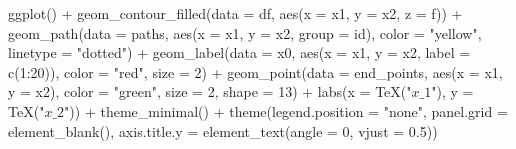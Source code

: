 \documentclass[
  a4paperpaper,
]{article}
\newenvironment{Shaded}{\begin{snugshade}}{\end{snugshade}}
\newcommand{\AttributeTok}[1]{\textcolor[rgb]{0.40,0.45,0.13}{#1}}
\newcommand{\DecValTok}[1]{\textcolor[rgb]{0.68,0.00,0.00}{#1}}
\newcommand{\FloatTok}[1]{\textcolor[rgb]{0.68,0.00,0.00}{#1}}
\newcommand{\FunctionTok}[1]{\textcolor[rgb]{0.28,0.35,0.67}{#1}}
\newcommand{\NormalTok}[1]{\textcolor[rgb]{0.00,0.23,0.31}{#1}}
\newcommand{\SpecialCharTok}[1]{\textcolor[rgb]{0.37,0.37,0.37}{#1}}
\newcommand{\StringTok}[1]{\textcolor[rgb]{0.13,0.47,0.30}{#1}}
\begin{document}
\begin{Shaded}
\begin{Highlighting}[]
\FunctionTok{ggplot}\NormalTok{() }\SpecialCharTok{+}
  \FunctionTok{geom\_contour\_filled}\NormalTok{(}\AttributeTok{data =}\NormalTok{ df, }\FunctionTok{aes}\NormalTok{(}\AttributeTok{x =}\NormalTok{ x1, }\AttributeTok{y =}\NormalTok{ x2, }\AttributeTok{z =}\NormalTok{ f)) }\SpecialCharTok{+}
  \FunctionTok{geom\_path}\NormalTok{(}\AttributeTok{data =}\NormalTok{ paths, }\FunctionTok{aes}\NormalTok{(}\AttributeTok{x =}\NormalTok{ x1, }\AttributeTok{y =}\NormalTok{ x2, }\AttributeTok{group =}\NormalTok{ id), }\AttributeTok{color =} \StringTok{"yellow"}\NormalTok{, }\AttributeTok{linetype =} \StringTok{"dotted"}\NormalTok{) }\SpecialCharTok{+}
  \FunctionTok{geom\_label}\NormalTok{(}\AttributeTok{data =}\NormalTok{ x0, }\FunctionTok{aes}\NormalTok{(}\AttributeTok{x =}\NormalTok{ x1, }\AttributeTok{y =}\NormalTok{ x2, }\AttributeTok{label =} \FunctionTok{c}\NormalTok{(}\DecValTok{1}\SpecialCharTok{:}\DecValTok{20}\NormalTok{)), }\AttributeTok{color =} \StringTok{"red"}\NormalTok{, }\AttributeTok{size =} \DecValTok{2}\NormalTok{) }\SpecialCharTok{+}
  \FunctionTok{geom\_point}\NormalTok{(}\AttributeTok{data =}\NormalTok{ end\_points, }\FunctionTok{aes}\NormalTok{(}\AttributeTok{x =}\NormalTok{ x1, }\AttributeTok{y =}\NormalTok{ x2), }\AttributeTok{color =} \StringTok{"green"}\NormalTok{, }\AttributeTok{size =} \DecValTok{2}\NormalTok{, }\AttributeTok{shape =} \DecValTok{13}\NormalTok{) }\SpecialCharTok{+}
  \FunctionTok{labs}\NormalTok{(}\AttributeTok{x =} \FunctionTok{TeX}\NormalTok{(}\StringTok{"$x\_1$"}\NormalTok{), }\AttributeTok{y =} \FunctionTok{TeX}\NormalTok{(}\StringTok{"$x\_2$"}\NormalTok{)) }\SpecialCharTok{+}
  \FunctionTok{theme\_minimal}\NormalTok{() }\SpecialCharTok{+}
  \FunctionTok{theme}\NormalTok{(}\AttributeTok{legend.position =} \StringTok{"none"}\NormalTok{,}
        \AttributeTok{panel.grid =} \FunctionTok{element\_blank}\NormalTok{(),}
        \AttributeTok{axis.title.y =} \FunctionTok{element\_text}\NormalTok{(}\AttributeTok{angle =} \DecValTok{0}\NormalTok{, }\AttributeTok{vjust =} \FloatTok{0.5}\NormalTok{))}
\end{Highlighting}
\end{Shaded}
\end{document}
